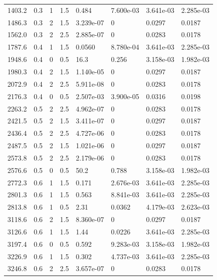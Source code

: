 \documentclass[preview]{standalone}
\begin{document}
{{\begin{tabular}{L{1.2cm}C{1.2cm} C{0.3cm}C{0.5cm} C{1.4cm}C{1.4cm} C{1.4cm}C{1.4cm}}
  1403.2  &   0.3  & 1     & 1.5 &  0.484  & 7.600e-03  & 3.641e-03 &  2.285e-03   \\ 
  1486.3  &   0.3  & 2     & 1.5 &  3.239e-07  & 0  & 0.0297 &  0.0187   \\ 
  1562.0  &   0.3  & 2     & 2.5 &  2.885e-07  & 0  & 0.0283 &  0.0178   \\ 
  1787.6  &   0.4  & 1     & 1.5 &  0.0560  & 8.780e-04  & 3.641e-03 &  2.285e-03   \\ 
  1948.6  &   0.4  & 0     & 0.5 &  16.3  & 0.256  & 3.158e-03 &  1.982e-03   \\ 
  1980.3  &   0.4  & 2     & 1.5 &  1.140e-05  & 0  & 0.0297 &  0.0187   \\ 
  2072.9  &   0.4  & 2     & 2.5 &  5.911e-08  & 0  & 0.0283 &  0.0178   \\ 
  2176.3  &   0.4  & 0     & 0.5 &  2.507e-03  & 3.900e-05  & 0.0316 &  0.0198   \\ 
  2263.2  &   0.5  & 2     & 2.5 &  4.962e-07  & 0  & 0.0283 &  0.0178   \\ 
  2421.5  &   0.5  & 2     & 1.5 &  3.411e-07  & 0  & 0.0297 &  0.0187   \\ 
  2436.4  &   0.5  & 2     & 2.5 &  4.727e-06  & 0  & 0.0283 &  0.0178   \\ 
  2487.5  &   0.5  & 2     & 1.5 &  1.021e-06  & 0  & 0.0297 &  0.0187   \\ 
  2573.8  &   0.5  & 2     & 2.5 &  2.179e-06  & 0  & 0.0283 &  0.0178   \\ 
  2576.6  &   0.5  & 0     & 0.5 &  50.2  & 0.788  & 3.158e-03 &  1.982e-03   \\ 
  2772.3  &   0.6  & 1     & 1.5 &  0.171  & 2.676e-03  & 3.641e-03 &  2.285e-03   \\ 
  2801.3  &   0.6  & 1     & 1.5 &  0.563  & 8.841e-03  & 3.641e-03 &  2.285e-03   \\ 
  2813.8  &   0.6  & 1     & 0.5 &  2.31  & 0.0362  & 4.179e-03 &  2.623e-03   \\ 
  3118.6  &   0.6  & 2     & 1.5 &  8.360e-07  & 0  & 0.0297 &  0.0187   \\ 
  3126.6  &   0.6  & 1     & 1.5 &  1.44  & 0.0226  & 3.641e-03 &  2.285e-03   \\ 
  3197.4  &   0.6  & 0     & 0.5 &  0.592  & 9.283e-03  & 3.158e-03 &  1.982e-03   \\ 
  3226.9  &   0.6  & 1     & 1.5 &  0.302  & 4.737e-03  & 3.641e-03 &  2.285e-03   \\ 
  3246.8  &   0.6  & 2     & 2.5 &  3.657e-07  & 0  & 0.0283 &  0.0178   \\ 

\end{tabular}}}
\end{document}
